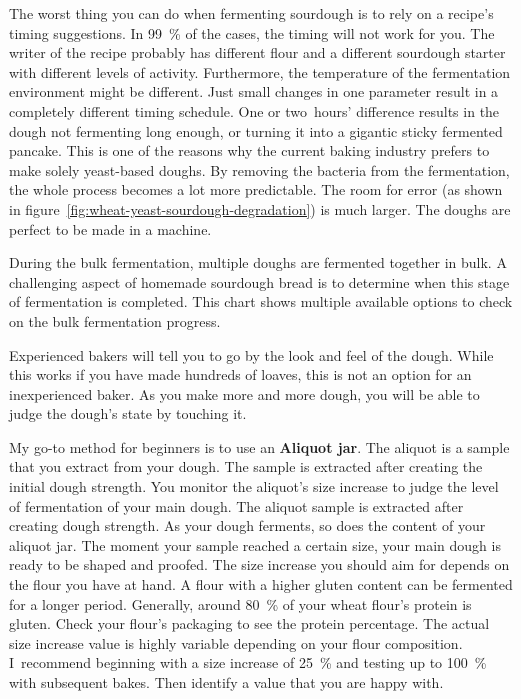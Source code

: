 The worst thing you can do when fermenting sourdough
is to rely on a recipe's timing suggestions. In \qty{99}{\percent}
of the cases, the timing will not work for you. The writer
of the recipe probably has different flour and a different
sourdough starter with different levels of activity. Furthermore,
the temperature of the fermentation environment might be
different. Just small changes in one parameter result
in a completely different timing schedule. One or two~hours'
difference results in the dough not fermenting long enough, or
turning it into a gigantic sticky fermented pancake. This
is one of the reasons why the current baking industry prefers
to make solely yeast-based doughs. By removing the bacteria
from the fermentation, the whole process becomes a lot more
predictable. The room for error (as shown in figure~\ref{fig:wheat-yeast-sourdough-degradation})
is much larger. The doughs are perfect to be made in a
machine.

\begin{flowchart}[!htb]
\begin{center}
  
  \caption[Process to check the bulk fermentation]{During the bulk
      fermentation, multiple doughs are fermented together in bulk.  A
      challenging aspect of homemade sourdough bread is to determine when this
      stage of fermentation is completed. This chart shows multiple available
      options to check on the bulk fermentation progress.}%
  \label{fig:bulk-fermentation}
\end{center}
\end{flowchart}

Experienced bakers will tell you to go by the look and feel of
the dough. While this works if you have made hundreds of loaves,
this is not an option for an inexperienced baker. As
you make more and more dough, you will be able to judge
the dough's state by touching it.

My go-to method for beginners is to use an \textbf{Aliquot jar}.
The aliquot is a sample that you extract from your dough. The
sample is extracted after creating the initial dough strength.
You monitor the aliquot's size increase to judge the
level of fermentation of your main dough. The aliquot
sample is extracted after creating dough strength. As your
dough ferments, so does the content of your aliquot jar. The moment your
sample reached a certain size, your main dough is ready
to be shaped and proofed. The size increase you should
aim for depends on the flour you have at hand. A flour
with a higher gluten content can be fermented for a
longer period. Generally, around \qty{80}{\percent}
of your wheat flour's protein is gluten. Check your flour's
packaging to see the protein percentage. The actual size increase
value is highly variable depending on your flour composition.
I~recommend beginning with a size increase of \qty{25}{\percent} and testing
up to \qty{100}{\percent} with subsequent bakes. Then identify a value
that you are happy with.

